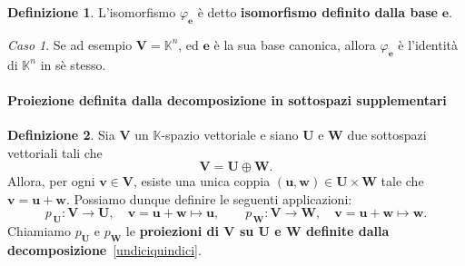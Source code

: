 \documentclass{article}
\theoremstyle{plain}
\theoremstyle{definition}
\newtheorem{defn}{Definizione}[section]
\theoremstyle{remark}
\newtheorem{case}{Caso}
\begin{document}
\vspace{10pt}

\begin{bxthm}
\begin{defn}
    L'isomorfismo $\varphi_\mathbf{e}$ è detto \textbf{isomorfismo definito dalla base} $\mathbf{e}$.
\end{defn}    
\end{bxthm}

\vspace{10pt}

\begin{case}
    Se ad esempio $\mathbf{V}=\mathbb{K}^n$, ed $\mathbf{e}$ è la sua base canonica, allora $\varphi_\mathbf{e}$ è l'identità di $\mathbb{K}^n$ in sè stesso.    
\end{case}

\vspace{10pt}

\paragraph{Proiezione definita dalla decomposizione in sottospazi supplementari}
\begin{bxthm}
\begin{defn}
Sia $\mathbf{V}$ un $\mathbb{K}$-spazio vettoriale e siano $\mathbf{U}$ e $\mathbf{W}$ due sottospazi vettoriali tali che
\begin{equation}\label{undiciquindici}
    \mathbf{V} = \mathbf{U} \oplus \mathbf{W}.
\end{equation}
Allora, per ogni $\mathbf{v} \in \mathbf{V}$, esiste una unica coppia $(\mathbf{u}, \mathbf{w}) \in \mathbf{U} \times \mathbf{W}$ tale che $\mathbf{v} = \mathbf{u} + \mathbf{w}$. Possiamo dunque definire le seguenti applicazioni:
\[
p_{\,\mathbf{U}} : \mathbf{V} \to \mathbf{U}, \quad \mathbf{v} = \mathbf{u} + \mathbf{w} \mapsto \mathbf{u}, \qquad
p_{\,\mathbf{W}} : \mathbf{V} \to \mathbf{W}, \quad \mathbf{v} = \mathbf{u} + \mathbf{w} \mapsto \mathbf{w}.
\]
Chiamiamo $p_{\mathbf{U}}$ e $p_{\mathbf{W}}$ le \textbf{proiezioni di $\mathbf{V}$ su $\mathbf{U}$ e $\mathbf{W}$ definite dalla decomposizione}~\eqref{undiciquindici}.
\end{defn}
\end{bxthm}

\vspace{10pt}
\end{document}
